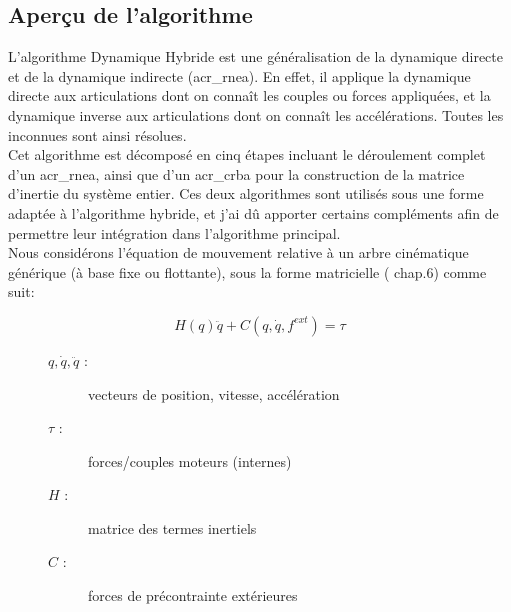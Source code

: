 \documentclass{report}
\begin{document}
\subsection{Aperçu de l'algorithme} \label{ch_impl_apercu}

L'algorithme Dynamique Hybride est une généralisation de la dynamique directe et de la dynamique indirecte (\gls{acr_rnea}). En effet, il applique la dynamique directe aux articulations dont on connaît les couples ou forces appliquées, et la dynamique inverse aux articulations dont on connaît les accélérations. Toutes les inconnues sont ainsi résolues.\\
Cet algorithme est décomposé en cinq étapes incluant le déroulement complet d'un \gls{acr_rnea}, ainsi que d'un \gls{acr_crba} pour la construction de la matrice d'inertie du système entier. Ces deux algorithmes sont utilisés sous une forme adaptée à l'algorithme hybride, et j'ai dû apporter certains compléments afin de permettre leur intégration dans l'algorithme principal.\\

Nous considérons l'équation de mouvement relative à un arbre cinématique générique (à base fixe ou flottante), sous la forme matricielle (\cite{bib_featherstone} chap.6) comme suit:

\begin{equation} \label{equ_equationMvt}
H(q)\ddot{q} + C(q,\dot{q},f^{ext}) = \tau
\end{equation}

\medskip

\begin{figure}
  \begin{flushright}
  \begin{minipage}[t]{0.45\textwidth}
  \begin{description}
    \item[$q, \dot{q}, \ddot{q}$ :] vecteurs de position, vitesse, accélération
    \item[$\tau$ :] forces/couples moteurs (internes)
    \item[$H$ :] matrice des termes inertiels
    \item[$C$ :] forces de précontrainte extérieures
  \end{description}
  \end{minipage}
  \end{flushright}
\end{figure}
\end{document}
